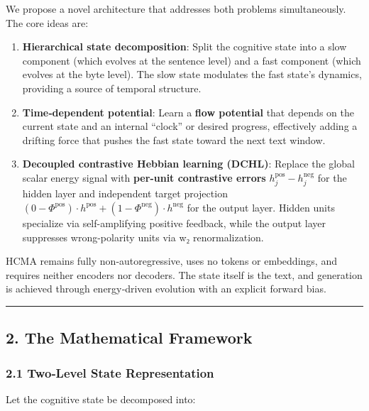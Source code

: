 \documentclass[
  11pt,
  a4paper,
]{article}
\begin{document}
We propose a novel architecture that addresses both problems
simultaneously. The core ideas are:

\begin{enumerate}
\def\labelenumi{\arabic{enumi}.}
\item
  \textbf{Hierarchical state decomposition}: Split the cognitive state
  into a slow component (which evolves at the sentence level) and a fast
  component (which evolves at the byte level). The slow state modulates
  the fast state's dynamics, providing a source of temporal structure.
\item
  \textbf{Time‑dependent potential}: Learn a \textbf{flow potential}
  that depends on the current state and an internal ``clock'' or desired
  progress, effectively adding a drifting force that pushes the fast
  state toward the next text window.
\item
  \textbf{Decoupled contrastive Hebbian learning (DCHL)}: Replace the
  global scalar energy signal with \textbf{per-unit contrastive errors}
  \(h^{\text{pos}}_j - h^{\text{neg}}_j\) for the hidden layer and
  independent target projection
  \((0-\Phi^{\text{pos}}) \cdot h^{\text{pos}} + (1-\Phi^{\text{neg}}) \cdot h^{\text{neg}}\)
  for the output layer. Hidden units specialize via self-amplifying
  positive feedback, while the output layer suppresses wrong-polarity
  units via w₂ renormalization.
\end{enumerate}

HCMA remains fully non‑autoregressive, uses no tokens or embeddings, and
requires neither encoders nor decoders. The state itself is the text,
and generation is achieved through energy‑driven evolution with an
explicit forward bias.

\begin{center}\rule{0.5\linewidth}{0.5pt}\end{center}

\subsection{2. The Mathematical
Framework}\label{the-mathematical-framework}

\subsubsection{2.1 Two‑Level State
Representation}\label{twolevel-state-representation}

Let the cognitive state be decomposed into:
\end{document}
